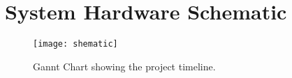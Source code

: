 \chapter{System Hardware Schematic}
\label{app:d}

\begin{figure}
 \centering 
 \texttt{[image: shematic]}
 \caption{Gannt Chart showing the project timeline.}
 \label{fig:hardware_schem}
\end{figure}